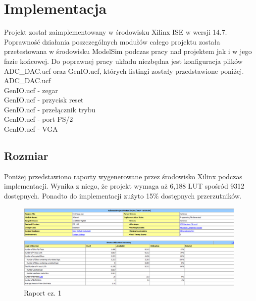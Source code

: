 \documentclass[a4paper]{report}
\begin{document}
\chapter{Implementacja}
	Projekt został zaimplementowany w środowisku Xilinx ISE w wersji 14.7. Poprawność działania poszczególnych
	modułów całego projektu została przetestowana w środowisku ModelSim podczas pracy nad projektem jak i w jego fazie końcowej.
	Do poprawnej pracy układu niezbędna jest konfiguracja plików ADC\_DAC.ucf oraz GenIO.ucf, których listingi zostały przedstawione
	poniżej.\\
	
	ADC\_DAC.ucf \\
	
	
	GenIO.ucf - zegar \\
	
	
	GenIO.ucf - przycisk reset \\
	
	
	GenIO.ucf - przełącznik trybu \\
	
	
	GenIO.ucf - port PS/2 \\
	
	
	GenIO.ucf - VGA \\
	

	\section{Rozmiar}
	
	Poniżej przedstawiono raporty wygenerowane przez środowisko Xilinx podczas implementacji.
	Wynika z niego, że projekt wymaga aż 6,188 LUT spośród 9312 dostępnych. Ponadto do implementacji
	zużyto 15\%  dostępnych przerzutników.
	
	\begin{figure}[h!]
				\centering
				\includegraphics[width=1.0\textwidth]{report1.png}
				\caption{Raport cz. 1}
	\end{figure}	
	
\end{document}
